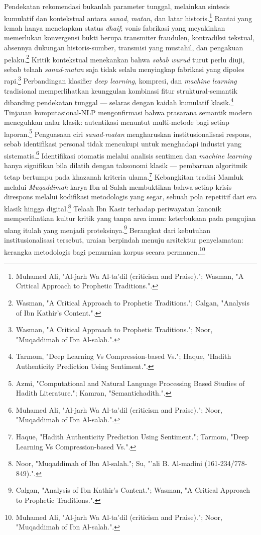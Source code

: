 Pendekatan rekomendasi bukanlah parameter tunggal, melainkan sintesis kumulatif dan kontekstual antara \textit{sanad}, \textit{matan}, dan latar historis.\footnote{Muhamed Ali, "Al-jarh Wa Al-ta'dil (criticism and Praise)."; Wasman, "A Critical Approach to Prophetic Traditions.".} Rantai yang lemah hanya menetapkan status \textit{dhaif}; vonis fabrikasi yang meyakinkan memerlukan konvergensi bukti berupa transmiter fraudulen, kontradiksi tekstual, absennya dukungan historis-sumber, transmisi yang mustahil, dan pengakuan pelaku.\footnote{Wasman, "A Critical Approach to Prophetic Traditions."; Calgan, "Analysis of Ibn Kathir's Content.".} Kritik kontekstual menekankan bahwa \textit{sabab wurud} turut perlu diuji, sebab telaah \textit{sanad}-\textit{matan} saja tidak selalu menyingkap fabrikasi yang dipoles rapi.\footnote{Wasman, "A Critical Approach to Prophetic Traditions."; Noor, "Muqaddimah of Ibn Al-salah.".} Perbandingan klasifier \textit{deep learning}, kompresi, dan \textit{machine learning} tradisional memperlihatkan keunggulan kombinasi fitur struktural-semantik dibanding pendekatan tunggal --- selaras dengan kaidah kumulatif klasik.\footnote{Tarmom, "Deep Learning Vs Compression-based Vs."; Haque, "Hadith Authenticity Prediction Using Sentiment.".} Tinjauan komputasional-NLP mengonfirmasi bahwa prasarana semantik modern meneguhkan nalar klasik: autentikasi menuntut multi-metode bagi setiap laporan.\footnote{Azmi, "Computational and Natural Language Processing Based Studies of Hadith Literature."; Kamran, "Semantichadith.".} Penguasaan ciri \textit{sanad}-\textit{matan} mengharuskan institusionalisasi respons, sebab identifikasi personal tidak mencukupi untuk menghadapi industri yang sistematis.\footnote{Muhamed Ali, "Al-jarh Wa Al-ta'dil (criticism and Praise)."; Noor, "Muqaddimah of Ibn Al-salah.".} Identifikasi otomatis melalui analisis sentimen dan \textit{machine learning} hanya signifikan bila dilatih dengan taksonomi klasik --- pembaruan algoritmik tetap bertumpu pada khazanah kriteria ulama.\footnote{Haque, "Hadith Authenticity Prediction Using Sentiment."; Tarmom, "Deep Learning Vs Compression-based Vs.".} Kebangkitan tradisi Mamluk melalui \textit{Muqaddimah} karya Ibn al-Salah membuktikan bahwa setiap krisis direspons melalui kodifikasi metodologis yang segar, sebuah pola repetitif dari era klasik hingga digital.\footnote{Noor, "Muqaddimah of Ibn Al-salah."; Su, "'ali B. Al-madini (161-234/778-849).".} Telaah Ibn Kasir terhadap periwayatan kanonik memperlihatkan kultur kritik yang tanpa area imun: keterbukaan pada pengujian ulang itulah yang menjadi proteksinya.\footnote{Calgan, "Analysis of Ibn Kathir's Content."; Wasman, "A Critical Approach to Prophetic Traditions.".} Berangkat dari kebutuhan institusionalisasi tersebut, uraian berpindah menuju arsitektur penyelamatan: kerangka metodologis bagi pemurnian korpus secara permanen.\footnote{Muhamed Ali, "Al-jarh Wa Al-ta'dil (criticism and Praise)."; Noor, "Muqaddimah of Ibn Al-salah.".}

